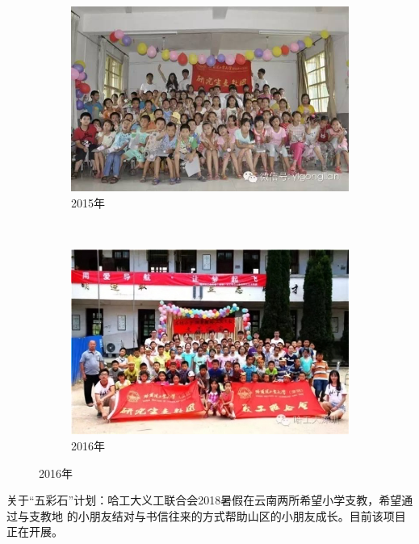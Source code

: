 \begin{enumerate}
\begin{itemize}
\begin{figure}[!ht]
\begin{subfigure}[b]{0.45\textwidth}
  \includegraphics[width=\textwidth]{pic/hitsz_2015.png}  
        \caption{2015年 }
    \end{subfigure}~
      \begin{subfigure}[b]{0.45\textwidth}
\includegraphics[width=\textwidth]{pic/hitsz_2016.jpeg}  
        \caption{2016年 }
    \end{subfigure}
\end{figure}
\end{itemize}
\end{enumerate}

关于“五彩石”计划：哈工大义工联合会2018暑假在云南两所希望小学支教，希望通过与支教地
的小朋友结对与书信往来的方式帮助山区的小朋友成长。目前该项目正在开展。